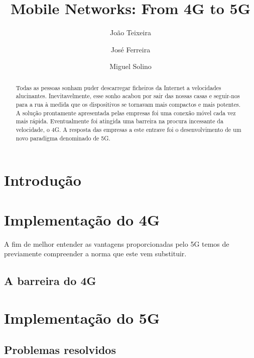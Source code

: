 \documentclass{llncs}
\begin{document}
\mainmatter
\title{Mobile Networks: From 4G to 5G}


\author{João Teixeira \and José Ferreira \and Miguel Solino}



\date{}


\maketitle
\begin{abstract}
Todas as pessoas sonham puder descarregar ficheiros da Internet a
velocidades alucinantes.
Inevitavelmente, esse sonho acabou por sair das nossas casas e
seguir-nos para a rua à medida que os dispositivos se tornavam mais
compactos e mais potentes.
A solução prontamente apresentada pelas empresas foi uma conexão
móvel cada vez mais rápida.
Eventualmente foi atingida uma barreira na procura incessante da
velocidade, o 4G. A resposta das empresas a este entrave foi o
desenvolvimento de um novo paradigma denominado de 5G.
\end{abstract}

\section{Introdução}

\section{Implementação do 4G}
A fim de melhor entender as vantagens proporcionadas pelo 5G temos
de previamente compreender a norma que este vem substituir.

\subsection{A barreira do 4G}
\section{Implementação do 5G}
\subsection{Problemas resolvidos}
\end{document}
